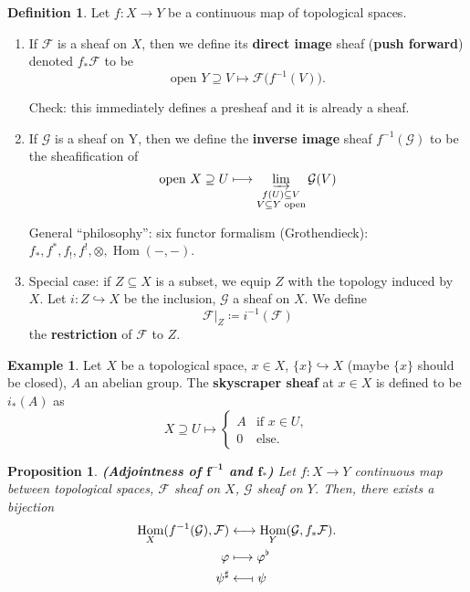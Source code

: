 \documentclass[12pt]{article}
\DeclareMathOperator{\Hom}{Hom}
\newtheorem*{proposition}{Proposition}
\theoremstyle{definition}
\newtheorem*{definition}{Definition}
\newtheorem*{example}{Example}
\theoremstyle{remark}
\begin{document}
\begin{definition}
Let $f:X\rightarrow Y$ be a continuous map of topological spaces.

\begin{enumerate}[label=\arabic*)]
\item If $\mathcal{F}$ is a sheaf on $X$, then we define its \textbf{direct image} sheaf (\textbf{push forward}) denoted $f_*\mathcal{F}$ to be
\[\text{open }Y\supseteq V\longmapsto\mathcal{F}\big(f^{-1}(V)\big).\]

Check: this immediately defines a presheaf and it is already a sheaf.

\item If $\mathcal{G}$ is a sheaf on Y, then we define the \textbf{inverse image} sheaf $f^{-1}(\mathcal{G})$ to be the sheafification of
\[\text{open }X\supseteq U\longmapsto\varinjlim_{\substack{f(U)\subseteq V\\V\subseteq Y\text{ open}}}\mathcal{G}(V)\]

General ``philosophy'': six functor formalism (Grothendieck): $f_*,f^*,f_!,f^!,\otimes,\Hom(-,-)$.

\item Special case: if $Z\subseteq X$ is a subset, we equip $Z$ with the topology induced by $X$. Let $i:Z\hookrightarrow X$ be the inclusion, $\mathcal{G}$ a sheaf on $X$. We define
\[\mathcal{F}|_Z\coloneqq i^{-1}(\mathcal{F})\]
the \textbf{restriction} of $\mathcal{F}$ to $Z$.
\end{enumerate}
\end{definition}

\begin{example}
Let $X$ be a topological space, $x\in X$, $\{x\}\hookrightarrow X$ (maybe $\{x\}$ should be closed), $A$ an abelian group. The \textbf{skyscraper sheaf} at $x\in X$ is defined to be $i_*(A)$ as
\[X\supseteq U\longmapsto\left\{\begin{array}{ll}A&\text{if }x\in U,\\0&\text{else}.\end{array}\right.\]
\end{example}

\begin{proposition}
\emph{\textbf{(Adjointness of $\boldsymbol{f^{-1}}$ and $\boldsymbol{f_*}$)}} Let $f:X\rightarrow Y$ continuous map between topological spaces, $\mathcal{F}$ sheaf on $X$, $\mathcal{G}$ sheaf on $Y$. Then, there exists a bijection
\begin{align*}
\Hom_X(f^{-1}(\mathcal{G}),\mathcal{F})&\longleftrightarrow\Hom_Y(\mathcal{G},f_*\mathcal{F}).\\
\varphi&\longmapsto\varphi^{\flat}\\
\psi^{\sharp}&\longleftarrow\!\shortmid\psi
\end{align*}
\end{proposition}
\end{document}
